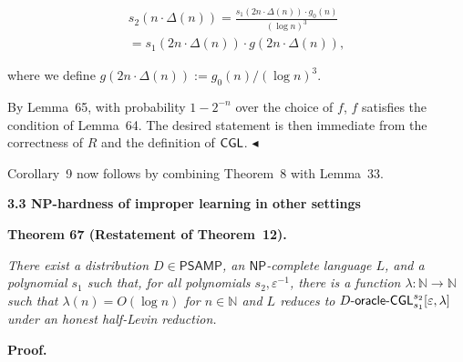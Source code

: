 \documentclass[10pt,a4paper]{article}
\begin{document}
\[\begin{gathered}
\displaystyle s_{2}(n\cdot\Delta(n)) \displaystyle=\frac{s_{1}(2n\cdot\Delta(n))\cdot g_{0}(n)}{(\log n)^{3}} \\
\displaystyle=s_{1}(2n\cdot\Delta(n))\cdot g(2n\cdot\Delta(n)),
\end{gathered}\]


where we define $g(2n\cdot\Delta(n)):=g_{0}(n)/(\log n)^{3}$.\par




By Lemma 65, with probability $1-2^{-n}$ over the choice of $f$, $f$ satisfies the condition of Lemma 64. The desired statement is then immediate from the correctness of $R$ and the definition of ${\sf CGL}$.
$\blacktriangleleft$\par




Corollary 9 now follows by combining Theorem 8 with Lemma 33.\par






\par\medskip\noindent\textbf{
3.3 NP-hardness of improper learning in other settings}\par





\par\medskip\noindent\textbf{
\textbf{Theorem 67}\textbf{ }(Restatement of Theorem 12)\textbf{.}
}\par



\emph{There exist a distribution $D\in{\mathsf{P}}{\mathsf{SAMP}}$, an ${\mathsf{NP}}$-complete language $L$, and a polynomial $s_{1}$ such that, for all polynomials $s_{2},\varepsilon^{-1}$, there is a function $\lambda:\mathbb{N}\to\mathbb{N}$ such that $\lambda(n)=O(\log n)$ for $n\in\mathbb{N}$ and $L$ reduces to $D\text{-}{\sf oracle}\text{-}{\sf CGL}^{s_{2}}_{s_{1}}[\varepsilon,\lambda]$ under an honest half-Levin reduction.}\par






\par\medskip\noindent\textbf{Proof.}\par
\end{document}
